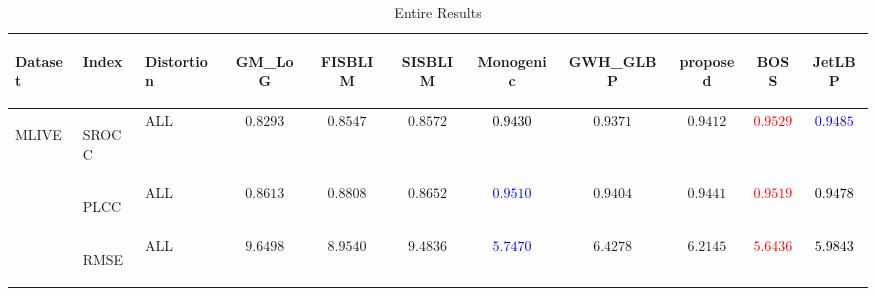 \documentclass{article}
\begin{document}
\begin{table}
\scriptsize
\caption{Entire Results}
\label{tbl:whole}
\begin{tabular}{||l|l|l||cccccccc||}
\toprule
\toprule
\begin{turn}{-90}\textbf{Dataset}\end{turn}&\begin{turn}{-90}\textbf{Index}\end{turn}&\begin{turn}{-90}\textbf{Distortion}\end{turn}&\begin{turn}{-90}\textbf{GM\_LoG}\end{turn}&\begin{turn}{-90}\textbf{FISBLIM}\end{turn}&\begin{turn}{-90}\textbf{SISBLIM}\end{turn}&\begin{turn}{-90}\textbf{Monogenic}\end{turn}&\begin{turn}{-90}\textbf{GWH\_GLBP}\end{turn}&\begin{turn}{-90}\textbf{proposed}\end{turn}&\begin{turn}{-90}\textbf{BOSS}\end{turn}&\begin{turn}{-90}\textbf{JetLBP}\end{turn}\\
\midrule
\midrule
\multirow{4}{*}{\begin{turn}{-90}MLIVE\end{turn}}&\multirow{1}{*}{\begin{turn}{-90}SROCC\end{turn}}&ALL&$0.8293$&$0.8547$&$0.8572$&\textbf{\textcolor{black}{$0.9430$}}&$0.9371$&$0.9412$&\textbf{\textcolor{red}{$0.9529$}}&\textbf{\textcolor{blue}{$0.9485$}}\\
\cmidrule{2-11}\cmidrule{2-11}
&\multirow{1}{*}{\begin{turn}{-90}PLCC\end{turn}}&ALL&$0.8613$&$0.8808$&$0.8652$&\textbf{\textcolor{blue}{$0.9510$}}&$0.9404$&$0.9441$&\textbf{\textcolor{red}{$0.9519$}}&\textbf{\textcolor{black}{$0.9478$}}\\
\cmidrule{2-11}\cmidrule{2-11}
&\multirow{1}{*}{\begin{turn}{-90}RMSE\end{turn}}&ALL&$9.6498$&$8.9540$&$9.4836$&\textbf{\textcolor{blue}{$5.7470$}}&$6.4278$&$6.2145$&\textbf{\textcolor{red}{$5.6436$}}&\textbf{\textcolor{black}{$5.9843$}}\\

\end{tabular}
\end{table}
\end{document}
